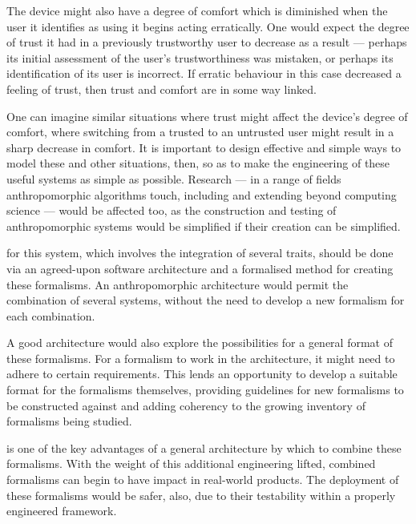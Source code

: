 The device might also have a degree of comfort which is diminished when the user it identifies as using it begins acting erratically. One would expect the degree of trust it had in a previously trustworthy user to decrease as a result --- perhaps its initial assessment of the user's trustworthiness was mistaken, or perhaps its identification of its user is incorrect. If erratic behaviour in this case decreased a feeling of trust, then trust and comfort are in some way linked. \par

One can imagine similar situations where trust might affect the device's degree of comfort, where switching from a trusted to an untrusted user might result in a sharp decrease in comfort. It is important to design effective and simple ways to model these and other situations, then, so as to make the engineering of these useful systems as simple as possible. Research --- in a range of fields anthropomorphic algorithms touch, including and extending beyond computing science --- would be affected too, as the construction and testing of anthropomorphic systems would be simplified if their creation can be simplified.\par

 for this system, which involves the integration of several traits, should be done via an agreed-upon software architecture and a formalised method for creating these formalisms. An anthropomorphic architecture would permit the combination of several systems, without the need to develop a new formalism for each combination.\par

A good architecture would also explore the possibilities for a general format of these formalisms. For a formalism to work in the architecture, it might need to adhere to certain requirements. This lends an opportunity to develop a suitable format for the formalisms themselves, providing guidelines for new formalisms to be constructed against and adding coherency to the growing inventory of formalisms being studied.\par

 is one of the key advantages of a general architecture by which to combine these formalisms. With the weight of this additional engineering lifted, combined formalisms can begin to have impact in real-world products. The deployment of these formalisms would be safer, also, due to their testability within a properly engineered framework.\par

